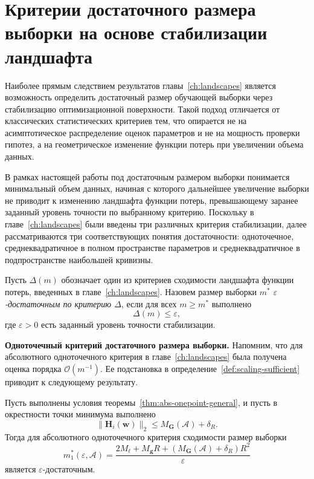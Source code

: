 \section{Критерии достаточного размера выборки на основе стабилизации ландшафта}

Наиболее прямым следствием результатов главы~\ref{ch:landscapes} является возможность определить достаточный размер обучающей выборки через стабилизацию оптимизационной поверхности. Такой подход отличается от классических статистических критериев тем, что опирается не на асимптотическое распределение оценок параметров и не на мощность проверки гипотез, а на геометрическое изменение функции потерь при увеличении объема данных.

В рамках настоящей работы под достаточным размером выборки понимается минимальный объем данных, начиная с которого дальнейшее увеличение выборки не приводит к изменению ландшафта функции потерь, превышающему заранее заданный уровень точности по выбранному критерию. Поскольку в главе~\ref{ch:landscapes} были введены три различных критерия стабилизации, далее рассматриваются три соответствующих понятия достаточности: одноточечное, среднеквадратичное в полном пространстве параметров и среднеквадратичное в подпространстве наибольшей кривизны.

\begin{definition}
    \label{def:scaling-sufficient}
    Пусть $\Delta(m)$ обозначает один из критериев сходимости ландшафта функции потерь, введенных в главе~\ref{ch:landscapes}. Назовем размер выборки $m^*$ \emph{$\varepsilon$-достаточным по критерию $\Delta$}, если для всех $m \geq m^*$ выполнено
    \begin{equation}
        \Delta(m) \leq \varepsilon,
    \end{equation}
    где $\varepsilon > 0$ есть заданный уровень точности стабилизации.
\end{definition}

\textbf{Одноточечный критерий достаточного размера выборки.} Напомним, что для абсолютного одноточечного критерия в главе~\ref{ch:landscapes} была получена оценка порядка $\mathcal O(m^{-1})$. Ее подстановка в определение~\ref{def:scaling-sufficient} приводит к следующему результату.

\begin{theorem}
    \label{thm:scaling-sufficient-onepoint}
    Пусть выполнены условия теоремы~\ref{thm:abs-onepoint-general}, и пусть в окрестности точки минимума выполнено
    \begin{equation}
        \|\mathbf H_i(\mathbf w)\|_2
        \le
        M_{\mathbf G}(\mathcal A)+\delta_R.
    \end{equation}
    Тогда для абсолютного одноточечного критерия сходимости размер выборки
    \begin{equation}
        \label{eq:scaling-m1}
        m_1^*(\varepsilon,\mathcal A)
        =
        \frac{
            2M_{\ell}
            +
            M_{\mathbf g}R
            +
            \left(M_{\mathbf G}(\mathcal A)+\delta_R\right)R^2
        }{\varepsilon}
    \end{equation}
    является $\varepsilon$-достаточным.
\end{theorem}

